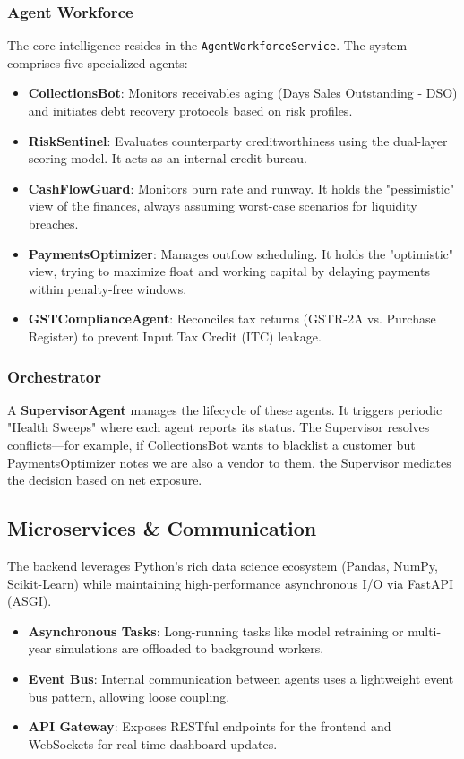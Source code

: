\documentclass[conference]{IEEEtran}
\begin{document}
\subsubsection{Agent Workforce}
The core intelligence resides in the \texttt{AgentWorkforceService}. The system comprises five specialized agents:
\begin{itemize}
    \item \textbf{CollectionsBot}: Monitors receivables aging (Days Sales Outstanding - DSO) and initiates debt recovery protocols based on risk profiles.
    \item \textbf{RiskSentinel}: Evaluates counterparty creditworthiness using the dual-layer scoring model. It acts as an internal credit bureau.
    \item \textbf{CashFlowGuard}: Monitors burn rate and runway. It holds the "pessimistic" view of the finances, always assuming worst-case scenarios for liquidity breaches.
    \item \textbf{PaymentsOptimizer}: Manages outflow scheduling. It holds the "optimistic" view, trying to maximize float and working capital by delaying payments within penalty-free windows.
    \item \textbf{GSTComplianceAgent}: Reconciles tax returns (GSTR-2A vs. Purchase Register) to prevent Input Tax Credit (ITC) leakage.
\end{itemize}

\subsubsection{Orchestrator}
A \textbf{SupervisorAgent} manages the lifecycle of these agents. It triggers periodic "Health Sweeps" where each agent reports its status. The Supervisor resolves conflicts---for example, if CollectionsBot wants to blacklist a customer but PaymentsOptimizer notes we are also a vendor to them, the Supervisor mediates the decision based on net exposure.

\subsection{Microservices \& Communication}
The backend leverages Python's rich data science ecosystem (Pandas, NumPy, Scikit-Learn) while maintaining high-performance asynchronous I/O via FastAPI (ASGI).
\begin{itemize}
    \item \textbf{Asynchronous Tasks}: Long-running tasks like model retraining or multi-year simulations are offloaded to background workers.
    \item \textbf{Event Bus}: Internal communication between agents uses a lightweight event bus pattern, allowing loose coupling.
    \item \textbf{API Gateway}: Exposes RESTful endpoints for the frontend and WebSockets for real-time dashboard updates.
\end{itemize}
\end{document}
